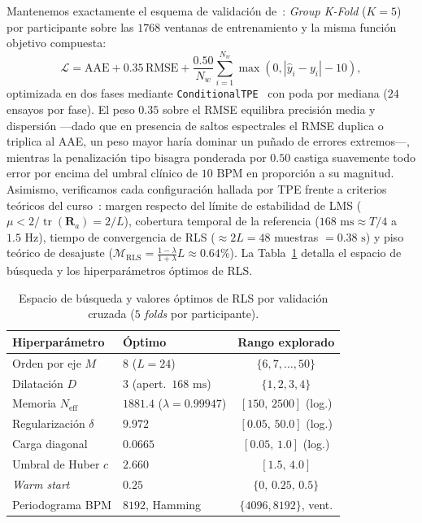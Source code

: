\documentclass[conference]{IEEEtran}
\begin{document}
Mantenemos exactamente el esquema de validación de~\cite{informe1}: \textit{Group K-Fold} ($K=5$) por participante sobre las $1768$ ventanas de entrenamiento y la misma función objetivo compuesta:
\begin{equation}
\mathcal{L}=\text{AAE}+0.35\,\text{RMSE}+\frac{0.50}{N_w}\sum_{i=1}^{N_w}\max\left(0,|\hat{y}_i-y_i|-10\right),
\label{eq:obj_func}
\end{equation}
optimizada en dos fases mediante \texttt{ConditionalTPE}~\cite{bergstra2011tpe} con poda por mediana ($24$ ensayos por fase). El peso $0.35$ sobre el RMSE equilibra precisión media y dispersión —dado que en presencia de saltos espectrales el RMSE duplica o triplica al AAE, un peso mayor haría dominar un puñado de errores extremos—, mientras la penalización tipo bisagra ponderada por $0.50$ castiga suavemente todo error por encima del umbral clínico de $10\text{ BPM}$ en proporción a su magnitud. Asimismo, verificamos cada configuración hallada por TPE frente a criterios teóricos del curso~\cite{haykin2014,ressl2026pas}: margen respecto del límite de estabilidad de LMS ($\mu<2/\operatorname{tr}(\mathbf{R}_a)=2/L$), cobertura temporal de la referencia ($168\text{ ms}\approx T/4$ a $1.5\text{ Hz}$), tiempo de convergencia de RLS ($\approx 2L=48$ muestras $=0.38\text{ s}$) y piso teórico de desajuste ($\mathcal{M}_{\text{RLS}}=\frac{1-\lambda}{1+\lambda}L\approx 0.64\%$). La Tabla~\ref{tab:hiper_rls} detalla el espacio de búsqueda y los hiperparámetros óptimos de RLS.

\begin{table}[!t]
    \centering
    \caption{Espacio de búsqueda y valores óptimos de RLS por validación cruzada ($5$ \textit{folds} por participante).}
    \label{tab:hiper_rls}
    \footnotesize
    \setlength{\tabcolsep}{1.8pt}
    \begin{tabular}{llc}
        \toprule
        \textbf{Hiperparámetro} & \textbf{Óptimo} & \textbf{Rango explorado} \\
        \midrule
        Orden por eje $M$ & $8$ ($L=24$) & $\{6,7,\dots,50\}$ \\
        Dilatación $D$ & $3$ (apert.\ $168\text{ ms}$) & $\{1,2,3,4\}$ \\
        Memoria $N_{\text{eff}}$ & $1881.4$ ($\lambda=0.99947$) & $[150,\,2500]$ (log.) \\
        Regularización $\delta$ & $9.972$ & $[0.05,\,50.0]$ (log.) \\
        Carga diagonal & $0.0665$ & $[0.05,\,1.0]$ (log.) \\
        Umbral de Huber $c$ & $2.660$ & $[1.5,\,4.0]$ \\
        \textit{Warm start} & $0.25$ & $\{0,\,0.25,\,0.5\}$ \\
        Periodograma BPM & $8192$, Hamming & $\{4096,8192\}$, vent. \\
        \bottomrule
    \end{tabular}
\end{table}
\end{document}
